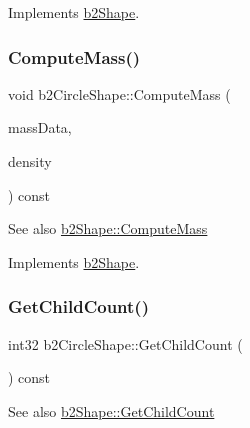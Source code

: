 Implements \hyperlink{classb2Shape_a61b365526241b47f124789b0309cac69}{b2\+Shape}.

\mbox{\label{classb2CircleShape_a5f2e516df3f347a51017bca2bd0e5aab}} 
\subsubsection{\texorpdfstring{Compute\+Mass()}{ComputeMass()}\hspace{0.1cm}{\footnotesize\ttfamily [2/2]}}
{\footnotesize\ttfamily void b2\+Circle\+Shape\+::\+Compute\+Mass (\begin{DoxyParamCaption}\item[{\hyperlink{structb2MassData}{b2\+Mass\+Data} $\ast$}]{mass\+Data,  }\item[{float32}]{density }\end{DoxyParamCaption}) const\hspace{0.3cm}{\ttfamily [virtual]}}

\begin{DoxySeeAlso}{See also}
\hyperlink{classb2Shape_a61b365526241b47f124789b0309cac69}{b2\+Shape\+::\+Compute\+Mass} 
\end{DoxySeeAlso}


Implements \hyperlink{classb2Shape_a61b365526241b47f124789b0309cac69}{b2\+Shape}.

\mbox{\label{classb2CircleShape_a750636bbf5ef7bd1bb4fd5e82be65d19}} 
\subsubsection{\texorpdfstring{Get\+Child\+Count()}{GetChildCount()}\hspace{0.1cm}{\footnotesize\ttfamily [1/2]}}
{\footnotesize\ttfamily int32 b2\+Circle\+Shape\+::\+Get\+Child\+Count (\begin{DoxyParamCaption}{ }\end{DoxyParamCaption}) const\hspace{0.3cm}{\ttfamily [virtual]}}

\begin{DoxySeeAlso}{See also}
\hyperlink{classb2Shape_a05a3c445017d96df9238ceefe6ce37ab}{b2\+Shape\+::\+Get\+Child\+Count} 
\end{DoxySeeAlso}


